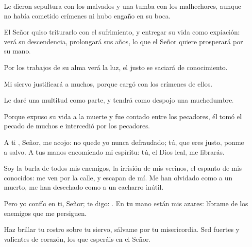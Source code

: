 \begin{readprose}
Le dieron sepultura con los malvados 
   y una tumba con los malhechores, 
   aunque no había cometido crímenes 
   ni hubo engaño en su boca. 
   
El Señor quiso triturarlo con el sufrimiento, 
   y entregar su vida como expiación: 
   verá su descendencia, 
   prolongará sus años, 
   lo que el Señor quiere prosperará por su mano. 
   
Por los trabajos de su alma verá la luz, 
   el justo se saciará de conocimiento. 
   
Mi siervo justificará a muchos, 
   porque cargó con los crímenes de ellos. 
   
Le daré una multitud como parte,
   y tendrá como despojo una muchedumbre. 
   
Porque expuso su vida a la muerte
   y fue contado entre los pecadores, 
   él tomó el pecado de muchos 
   e intercedió por los pecadores.
\end{readprose}


\newpage 
{}

 


\begin{psbody}
A ti , Señor, me acojo: 
no quede yo nunca defraudado; 
tú, que eres justo, ponme a salvo. 
A tus manos encomiendo mi espíritu: 
tú, el Dios leal, me librarás. 

Soy la burla de todos mis enemigos, 
la irrisión de mis vecinos, 
el espanto de mis conocidos: 
me ven por la calle, y escapan de mí. 
Me han olvidado como a un muerto, 
me han desechado como a un cacharro inútil. 

Pero yo confío en ti, Señor; 
te digo: . 
En tu mano están mis azares: 
líbrame de los enemigos que me persiguen. 

Haz brillar tu rostro sobre tu siervo, 
sálvame por tu misericordia. 
Sed fuertes y valientes de corazón, 
los que esperáis en el Señor. 
\end{psbody}


\newpage 
{}

 


